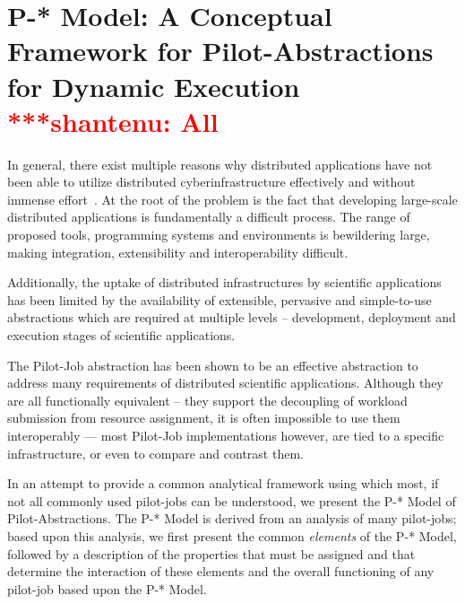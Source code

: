 \documentclass[conference,final]{IEEEtran}
\newcommand{\jhanote}[1]{ {\textcolor{red} { ***shantenu: #1 }}}
\newcommand{\jhanote}[1]{}
\begin{document}

\section{P-* Model: A Conceptual Framework for Pilot-Abstractions for
  Dynamic Execution \jhanote{All}}
\label{sec:pilot-model}


In general, there exist multiple reasons why distributed applications
have not been able to utilize distributed cyberinfrastructure
effectively and without immense effort~\cite{dpa_surveypaper}.  At the
root of the problem is the fact that developing large-scale
distributed applications is fundamentally a difficult process. The
range of proposed tools, programming systems and environments is
bewildering large, making integration, extensibility and
interoperability difficult.
 
Additionally, the uptake of distributed infrastructures by scientific
applications has been limited by the availability of extensible,
pervasive and simple-to-use abstractions which are required at
multiple levels – development, deployment and execution stages of
scientific applications.


The Pilot-Job abstraction has been shown to be an effective
abstraction to address many requirements of distributed scientific
applications. Although they are all functionally equivalent -- they
support the decoupling of workload submission from resource
assignment, it is often impossible to use them interoperably --- most
Pilot-Job implementations however, are tied to a specific
infrastructure, or even to compare and contrast them.

In an attempt to provide a common analytical framework using which
most, if not all commonly used pilot-jobs can be understood, we
present the P-* Model of Pilot-Abstractions. The P-* Model is derived
from an analysis of many pilot-jobs; based upon this analysis, we
first present the common {\it elements} of the P-* Model, followed by
a description of the properties that must be assigned and that
determine the interaction of these elements and the overall
functioning of any pilot-job based upon the P-* Model.
\end{document}
